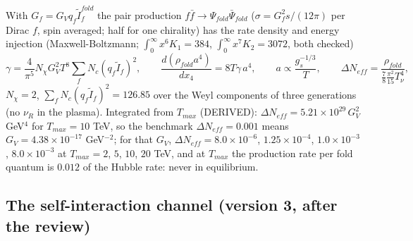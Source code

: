 \documentclass[
  10pt,
]{article}
\begin{document}
With \(G_f = G_Vq_f\tilde I^{fold}_f\) the pair production
\(f\bar f \to \Psi_{fold}\bar\Psi_{fold}\) (\(\sigma = G_f^2s/(12\pi)\)
per Dirac \(f\), spin averaged; half for one chirality) has the rate
density and energy injection (Maxwell-Boltzmann;
\(\int_0^\infty x^6K_1 = 384\), \(\int_0^\infty x^7K_2 = 3072\), both
checked)
\[ \gamma = \frac{4}{\pi^5}N_\chi G_V^2T^8\sum_fN_c(q_f\tilde I_f)^2,\qquad \frac{d(\rho_{fold}a^4)}{dx_4} = 8T\gamma\,a^4,\qquad a \propto \frac{g_s^{-1/3}}{T},\qquad
   \Delta N_{eff} = \frac{\rho_{fold}}{\frac78\frac{\pi^2}{15}T_\nu^4}, \]
\(N_\chi = 2\), \(\sum_fN_c(q_f\tilde I_f)^2 = 126.85\) over the Weyl
components of three generations (no \(\nu_R\) in the plasma). Integrated
from \(T_{max}\) (DERIVED):
\(\Delta N_{eff} = 5.21\times10^{29}\,G_V^2\) GeV\(^4\) for
\(T_{max} = 10\) TeV, so the benchmark \(\Delta N_{eff} = 0.001\) means
\(G_V = 4.38\times10^{-17}\) GeV\(^{-2}\); for that \(G_V\),
\(\Delta N_{eff} = 8.0\times10^{-6}\), \(1.25\times10^{-4}\),
\(1.0\times10^{-3}\), \(8.0\times10^{-3}\) at \(T_{max} = 2\), \(5\),
\(10\), \(20\) TeV, and at \(T_{max}\) the production rate per fold
quantum is \(0.012\) of the Hubble rate: never in equilibrium.

\hypertarget{the-self-interaction-channel-version-3-after-the-review}{%
\subsection{The self-interaction channel (version 3, after the
review)}\label{the-self-interaction-channel-version-3-after-the-review}}
\end{document}
